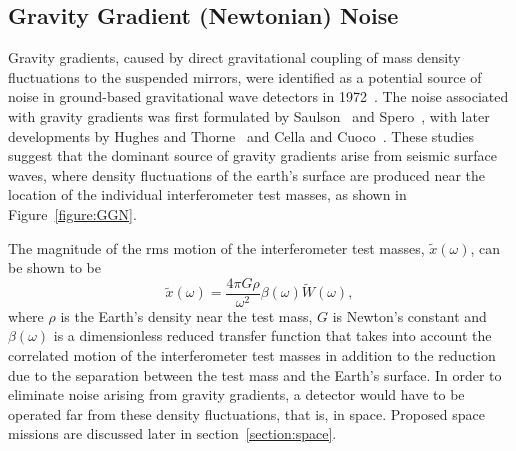 \documentclass{article}
\begin{document}
\subsection{Gravity Gradient (Newtonian) Noise}
\label{subsection:gravitygradient}

Gravity gradients, caused by direct gravitational coupling of mass density
fluctuations to the suspended mirrors, were identified as a potential source of
noise in ground-based gravitational wave detectors in 1972~\cite{Weiss}. The
noise associated with gravity gradients was first formulated by
Saulson~\cite{Saulson1} and Spero~\cite{Spero}, with later developments by
Hughes and Thorne~\cite{Thorne:1998} and Cella and Cuoco~\cite{Beccariay:1998}.
These studies suggest that the dominant source of gravity gradients arise from
seismic surface waves, where density fluctuations of the earth's surface are
produced near the location of the individual interferometer test masses, as
shown in Figure~\ref{figure:GGN}.


The magnitude of the rms motion of the interferometer test masses,
$\tilde{x}(\omega)$, can be shown to be~\cite{Thorne:1998}
%
\begin{equation}
  \tilde{x}(\omega) = \frac{4 \pi G \rho}{\omega^{2}} \beta(\omega)
\tilde{W}(\omega),
  \label{equation:GGN}
\end{equation}
%
where $\rho$ is the Earth's density near the test mass, $G$ is Newton's constant
and $\beta(\omega)$ is a dimensionless reduced transfer function that takes into
account the correlated motion of the interferometer test masses in addition to
the reduction due to the separation between the test mass and the Earth's
surface.  In order to eliminate noise arising from gravity gradients, a detector
would have to be operated far from these density fluctuations, that is, in
space.  Proposed space missions are discussed later in
section~\ref{section:space}.
\end{document}
